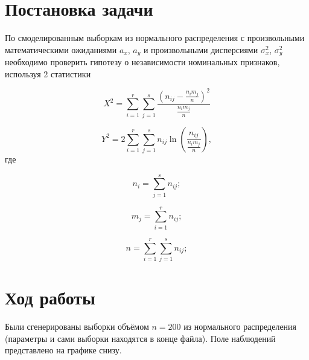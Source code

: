 \section{Постановка задачи}

По смоделированным выборкам из нормального распределения с произвольными математическими ожиданиями $a_x$, $a_y$ и произвольными дисперсиями $\sigma^2_x$, $\sigma^2_y$ необходимо проверить гипотезу о независимости номинальных признаков, используя 2 статистики

\begin{equation}\label{x}
	X^2 = \sum\limits_{i=1}^r \sum\limits_{j=1}^s \frac{\left(n_{ij} - \frac{n_i m_j}{n}\right)^2}{\frac{n_i m_j}{n}}
\end{equation}

\begin{equation}\label{y}
	Y^2 = 2 \sum\limits_{i=1}^r \sum\limits_{j=1}^s n_{ij} \ln \left(\frac{n_{ij}}{\frac{n_i m_j}{n}}\right),
\end{equation}
где 

\begin{equation*}
	n_i = \sum\limits_{j=1}^s n_{ij}; 
\end{equation*}

\begin{equation*}
	m_j = \sum\limits_{i=1}^r n_{ij};
\end{equation*}

\begin{equation*}
	n = \sum\limits_{i=1}^r \sum\limits_{j=1}^s n_{ij};
\end{equation*}

\section{Ход работы}

Были сгенерированы выборки объёмом $n = 200$ из нормального распределения (параметры и сами выборки находятся в конце файла). Поле наблюдений представлено на графике снизу.

